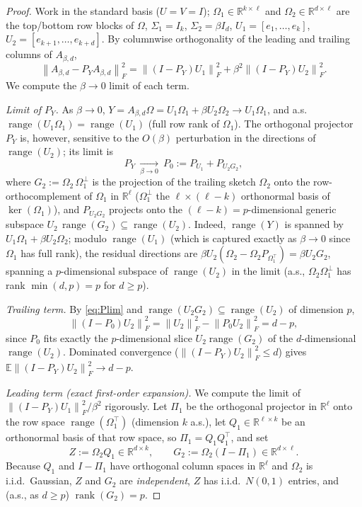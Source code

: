 \documentclass{amsart}
\theoremstyle{definition}
\DeclareMathOperator{\rank}{rank}
\DeclareMathOperator{\range}{range}
\newcommand{\R}{\mathbb{R}}
\newcommand{\Frob}[1]{\left\lVert #1\right\rVert_F}
\newcommand{\E}{\mathbb{E}}
\begin{document}
\begin{proof}
Work in the standard basis ($U=V=I$); $\Omega_1\in\R^{k\times\ell}$ and
$\Omega_2\in\R^{d\times\ell}$ are the top/bottom row blocks of $\Omega$,
$\Sigma_1=I_k$, $\Sigma_2=\beta I_d$, $U_1=[e_1,\dots,e_k]$,
$U_2=[e_{k+1},\dots,e_{k+d}]$. By columnwise orthogonality of the leading and
trailing columns of $A_{\beta,d}$,
\begin{equation}\label{eq:exactdecomp}
\Frob{A_{\beta,d}-P_YA_{\beta,d}}^2
=\Frob{(I-P_Y)U_1}^2+\beta^2\Frob{(I-P_Y)U_2}^2 .
\end{equation}
We compute the $\beta\to0$ limit of each term.

\emph{Limit of $P_Y$.} As $\beta\to0$, $Y=A_{\beta,d}\Omega=U_1\Omega_1+\beta U_2\Omega_2
\to U_1\Omega_1$, and a.s.\ $\range(U_1\Omega_1)=\range(U_1)$ (full row rank of
$\Omega_1$). The orthogonal projector $P_Y$ is, however, sensitive to the
$O(\beta)$ perturbation in the directions of $\range(U_2)$; its limit is
\begin{equation}\label{eq:Plim}
P_Y\ \xrightarrow[\beta\to0]{}\ P_0:=P_{U_1}+P_{U_2 G_2},
\end{equation}
where $G_2:=\Omega_2\,\Omega_1^\perp$ is the projection of the trailing sketch
$\Omega_2$ onto the row-orthocomplement of $\Omega_1$ in $\R^\ell$
($\Omega_1^\perp$ the $\ell\times(\ell-k)$ orthonormal basis of
$\ker(\Omega_1)$), and $P_{U_2G_2}$ projects onto the $(\ell-k)=p$-dimensional
generic subspace $U_2\,\range(G_2)\subseteq\range(U_2)$. Indeed, $\range(Y)$ is
spanned by $U_1\Omega_1+\beta U_2\Omega_2$; modulo $\range(U_1)$ (which is
captured exactly as $\beta\to0$ since $\Omega_1$ has full rank), the residual
directions are $\beta U_2(\Omega_2-\Omega_2 P_{\Omega_1^\top})=\beta U_2 G_2$,
spanning a $p$-dimensional subspace of $\range(U_2)$ in the limit (a.s.,
$\Omega_2\Omega_1^\perp$ has rank $\min(d,p)=p$ for $d\ge p$).

\emph{Trailing term.} By \eqref{eq:Plim} and $\range(U_2G_2)\subseteq\range(U_2)$
of dimension $p$,
\[
\Frob{(I-P_0)U_2}^2=\Frob{U_2}^2-\Frob{P_0U_2}^2=d-p,
\]
since $P_0$ fits exactly the $p$-dimensional slice $U_2\range(G_2)$ of the
$d$-dimensional $\range(U_2)$. Dominated convergence ($\Frob{(I-P_Y)U_2}^2\le d$)
gives $\E\Frob{(I-P_Y)U_2}^2\to d-p$.

\emph{Leading term (exact first-order expansion).} We compute the limit of
$\Frob{(I-P_Y)U_1}^2/\beta^2$ rigorously. Let $\Pi_1$ be the orthogonal
projector in $\R^\ell$ onto the row space $\range(\Omega_1^\top)$ (dimension $k$
a.s.), let $Q_1\in\R^{\ell\times k}$ be an orthonormal basis of that row space, so
$\Pi_1=Q_1Q_1^\top$, and set
\begin{equation}\label{eq:ZG2def}
Z:=\Omega_2 Q_1\in\R^{d\times k},\qquad G_2:=\Omega_2(I-\Pi_1)\in\R^{d\times\ell}.
\end{equation}
Because $Q_1$ and $I-\Pi_1$ have orthogonal column spaces in $\R^\ell$ and
$\Omega_2$ is i.i.d.\ Gaussian, $Z$ and $G_2$ are \emph{independent}, $Z$ has
i.i.d.\ $N(0,1)$ entries, and (a.s., as $d\ge p$) $\rank(G_2)=p$.


\end{proof}
\end{document}
